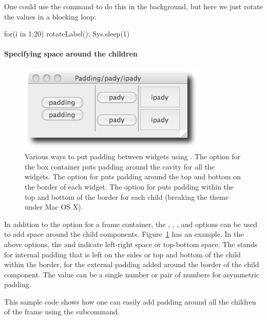 One could use the  command to do this in the background,
but here we just rotate the values in a blocking loop:
\begin{Schunk}
\begin{Sinput}
 for(i in 1:20) {rotateLabel(); Sys.sleep(1)}
\end{Sinput}
\end{Schunk}


\paragraph{Specifying space around the children}

\begin{figure}
  \centering
  \includegraphics[width=.6\textwidth]{fig-tcltk-padding-pady-ipady}
 \caption{Various ways to put padding between widgets using . The  option for the box container puts padding around the cavity for all the widgets. The  option for  puts padding around the top and bottom on the border of each widget. The  option for  puts padding within the top and bottom of the border for each child (breaking the theme under Mac OS X).}
  \label{fig:fig-pack-example}
\end{figure}


In addition to the  option for a frame container, the
, , ,
and  options can be used to add space around the
child components. Figure~\ref{fig:fig-pack-example} has an
example. In the above options, the  and  indicate left-right space or
top-bottom space. The  stands for internal padding that is
left on the sides or top and bottom of the child within the border,
for  the external padding added around the border of the
child component. The value can be a single number or pair of numbers
for asymmetric padding.


This sample code shows how one can easily add padding around all the
children of the frame  using the
 subcommand.

